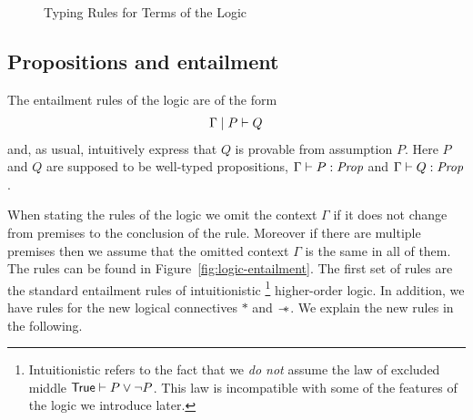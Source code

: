 {
}

\begin{figure}[htbp]
  \typingrules
  \caption{Typing Rules for Terms of the Logic}
  \label{fig:type-rules-logic}
\end{figure}

\subsection{Propositions and entailment}
\label{sec:propositions-and-entailment}

The entailment rules of the logic are of the form
\begin{align*}
  \Gamma \mid P \vdash Q
\end{align*}
and, as usual, intuitively express that $Q$ is provable from assumption $P$.
Here $P$ and $Q$ are supposed to be well-typed propositions, \ie{} $\Gamma \vdash P : \textit{Prop}$ and $\Gamma \vdash Q : \textit{Prop}$.

When stating the rules of the logic we omit the context $\Gamma$ if it does not change from premises to the conclusion of the rule.
Moreover if there are multiple premises then we assume that the omitted context $\Gamma$ is the same in all of them.
The rules can be found in Figure~\ref{fig:logic-entailment}.
The first set of rules are the standard entailment rules of intuitionistic%
\footnote{Intuitionistic refers to the fact that we \emph{do not} assume the law of excluded middle $\textsf{\upshape True} \vdash P \lor \lnot P$.
  This law is incompatible with some of the features of the logic we introduce later.} higher-order logic.
In addition, we have rules for the new logical connectives $\ast$ and $\mathrel{-\!\!\ast}$.
We explain the new rules in the following.

